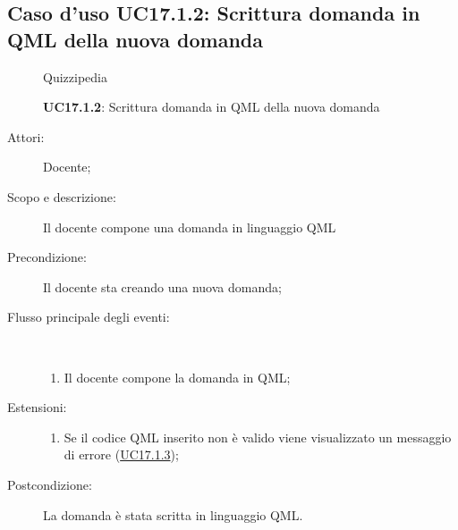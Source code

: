 \subsection{Caso d'uso UC17.1.2: Scrittura domanda in QML della nuova domanda}
\begin{figure}[H]
	\centering
	\begin{resizedtikzpicture}{\textwidth}
		\begin{umlsystem}[x=0, fill=lightgray!20]{Quizzipedia}
		\end{umlsystem}
	\end{resizedtikzpicture}
	\caption{\textbf{UC17.1.2}: Scrittura domanda in QML della nuova domanda}
	\label{UC17.1.2}
\end{figure}
\begin{description}
	\item[Attori:] Docente;
	\item[Scopo e descrizione:] Il docente compone una domanda in linguaggio QML
	\item[Precondizione:] Il docente sta creando una nuova domanda;
	
	\item[Flusso principale degli eventi:] \ 
	\begin{enumerate}
		\item Il docente compone la domanda in QML;
		
	\end{enumerate}
	\item[Estensioni:]
	\begin{enumerate}
		\item Se il codice QML inserito non è valido viene visualizzato un messaggio di errore (\hyperlink{UC17.1.3}{UC17.1.3});
		
	\end{enumerate}
	\item[Postcondizione:] La domanda è stata scritta in linguaggio QML.
\end{description}
\hypertarget{UC17.1.3}{}
